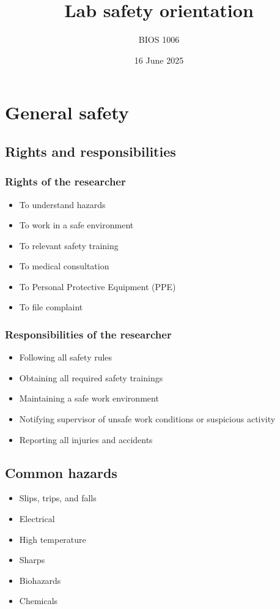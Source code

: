 \documentclass[letterpaper, 12pt]{article}
\title{Lab safety orientation}
\author{BIOS 1006}
\date{16 June 2025}
\begin{document}
\maketitle

\section*{General safety}

\subsection*{Rights and responsibilities}

\subsubsection*{Rights of the researcher}

\begin{itemize}
\item To understand hazards
\item To work in a safe environment
\item To relevant safety training
\item To medical consultation
\item To Personal Protective Equipment (PPE)
\item To file complaint
\end{itemize}

\subsubsection*{Responsibilities of the researcher}

\begin{itemize}
\item Following all safety rules
\item Obtaining all required safety trainings
\item Maintaining a safe work environment 
\item Notifying supervisor of unsafe work conditions or suspicious activity
\item Reporting all injuries and accidents
\end{itemize}

\subsection*{Common hazards}

\begin{itemize}
\item Slips, trips, and falls
\item Electrical
\item High temperature 
\item Sharps
\item Biohazards
\item Chemicals
\end{itemize}
\end{document}
